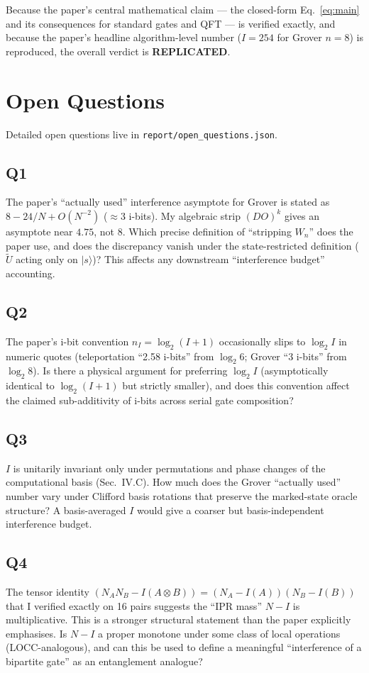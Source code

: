 \documentclass[11pt]{article}
\begin{document}
Because the paper's central mathematical claim --- the closed-form
Eq.~\ref{eq:main} and its consequences for standard gates and QFT --- is
verified exactly, and because the paper's headline algorithm-level number
($I = 254$ for Grover $n=8$) is reproduced, the overall verdict is
\textbf{REPLICATED}.

\section{Open Questions}

Detailed open questions live in \verb|report/open_questions.json|.

\subsection*{Q1}
The paper's ``actually used'' interference asymptote for Grover is stated as
$8 - 24/N + O(N^{-2})$ ($\approx$3 i-bits). My algebraic strip $(DO)^k$
gives an asymptote near $4.75$, not $8$. Which precise definition of
``stripping $W_n$'' does the paper use, and does the discrepancy vanish
under the state-restricted definition ($\tilde U$ acting only on $|s\rangle$)?
This affects any downstream ``interference budget'' accounting.

\subsection*{Q2}
The paper's i-bit convention $n_I = \log_2(I+1)$ occasionally slips to
$\log_2 I$ in numeric quotes (teleportation ``2.58 i-bits'' from $\log_2 6$;
Grover ``3 i-bits'' from $\log_2 8$). Is there a physical argument for
preferring $\log_2 I$ (asymptotically identical to $\log_2(I+1)$ but
strictly smaller), and does this convention affect the claimed sub-additivity
of i-bits across serial gate composition?

\subsection*{Q3}
$I$ is unitarily invariant only under permutations and phase changes of the
computational basis (Sec.~IV.C). How much does the Grover ``actually used''
number vary under Clifford basis rotations that preserve the marked-state
oracle structure? A basis-averaged $I$ would give a coarser but
basis-independent interference budget.

\subsection*{Q4}
The tensor identity $(N_A N_B - I(A\otimes B)) = (N_A - I(A))(N_B - I(B))$
that I verified exactly on 16 pairs suggests the ``IPR mass'' $N - I$ is
multiplicative. This is a stronger structural statement than the paper
explicitly emphasises. Is $N - I$ a proper monotone under some class of
local operations (LOCC-analogous), and can this be used to define a
meaningful ``interference of a bipartite gate'' as an entanglement analogue?
\end{document}
